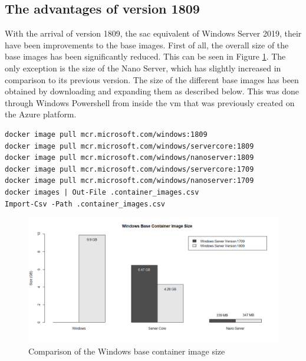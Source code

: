 \subsection{The advantages of version 1809}
With the arrival of version 1809, the \acrfull{sac} equivalent of Windows Server 2019, their have been improvements to the base images. First of all, the overall size of the base images has been significantly reduced. This can be seen in Figure \ref{fig:container_size}. The only exception is the size of the Nano Server, which has slightly increased in comparison to its previous version. 
The size of the different base images has been obtained by downloading and expanding them as described below. This was done through Windows Powershell from inside the \acrshort{vm} that was previously created on the Azure platform. 

\begin{lstlisting}[breaklines]
docker image pull mcr.microsoft.com/windows:1809
docker image pull mcr.microsoft.com/windows/servercore:1809
docker image pull mcr.microsoft.com/windows/nanoserver:1809  
docker image pull mcr.microsoft.com/windows/servercore:1709 
docker image pull mcr.microsoft.com/windows/nanoserver:1709   
docker images | Out-File .container_images.csv
Import-Csv -Path .container_images.csv
\end{lstlisting}

\begin{figure}[h]
	\captionsetup{width=0.8\linewidth}
	\includegraphics[width=0.9\linewidth]{img/Methodologie/Containers0.png}
	\centering
	\caption{Comparison of the Windows base container image size}
	\label{fig:container_size}	
\end{figure}

